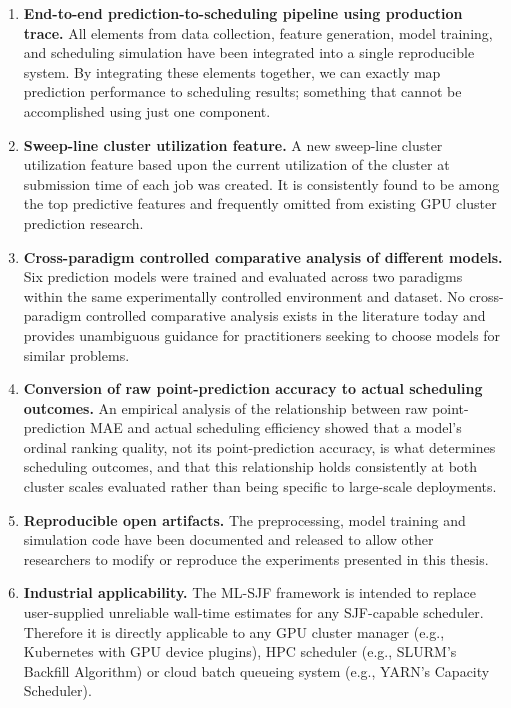 \begin{enumerate}

    \item \textbf{End-to-end prediction-to-scheduling pipeline using production trace.} All elements from data collection, feature generation, model training, and scheduling simulation have been integrated into a single reproducible system. By integrating these elements together, we can exactly map prediction performance to scheduling results; something that cannot be accomplished using just one component.

    \item \textbf{Sweep-line cluster utilization feature.} A new sweep-line cluster utilization feature based upon the current utilization of the cluster at submission time of each job was created. It is consistently found to be among the top predictive features and frequently omitted from existing GPU cluster prediction research.

    \item \textbf{Cross-paradigm controlled comparative analysis of different models.} Six prediction models were trained and evaluated across two paradigms within the same experimentally controlled environment and dataset. No cross-paradigm controlled comparative analysis exists in the literature today and provides unambiguous guidance for practitioners seeking to choose models for similar problems.

    \item \textbf{Conversion of raw point-prediction accuracy to actual scheduling outcomes.} An empirical analysis of the relationship between raw point-prediction MAE and actual scheduling efficiency showed that a model's ordinal ranking quality, not its point-prediction accuracy, is what determines scheduling outcomes, and that this relationship holds consistently at both cluster scales evaluated rather than being specific to large-scale deployments.

    \item \textbf{Reproducible open artifacts.} The preprocessing, model training and simulation code have been documented and released to allow other researchers to modify or reproduce the experiments presented in this thesis.

    \clearpage
    \item \textbf{Industrial applicability.} The ML-SJF framework is intended to replace user-supplied unreliable wall-time estimates for any SJF-capable scheduler. Therefore it is directly applicable to any GPU cluster manager (e.g., Kubernetes with GPU device plugins), HPC scheduler (e.g., SLURM's Backfill Algorithm) or cloud batch queueing system (e.g., YARN's Capacity Scheduler).

\end{enumerate}

